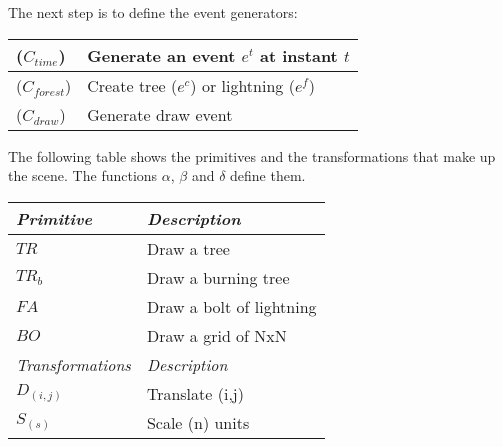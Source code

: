\documentclass[a4paper,twoside]{article}
\begin{document}

\noindent The next step is to define the event generators:


\begin{table}[h]
\begin{center}
\begin{small}
    \begin{tabular}{|l|l|}
        \hline ($C_{time}$)   & Generate an event $e^t$ at instant $t$\\
        \hline ($C_{forest}$)   & Create tree ($e^{c}$) or lightning ($e^{f}$)\\
        \hline ($C_{draw}$)   & Generate draw event\\
        \hline
\end{tabular}
\end{small}
\end{center}
\vspace{-0.3cm}
\end{table}




The following table shows the primitives and the transformations that make up the scene. The
functions ${\alpha}$, ${\beta}$ and ${\delta}$ define them.


\begin{table}[h]
\begin{center}
\begin{small}
    \begin{tabular}{|l|l|}
        \hline \itshape Primitive & \itshape Description\\
        \hline $TR$   & Draw a tree\\
        \hline $TR_b$ & Draw a burning tree\\
        \hline $FA$   & Draw a bolt of lightning\\
        \hline $BO$   & Draw a grid of NxN \\
        \hline
        \hline \itshape Transformations & \itshape Description\\
        \hline $D_{(i,j)}$ & Translate (i,j)\\
        \hline $S_{(s)}$ & Scale (n) units\\
        \hline
    \end{tabular}
\end{small}
\end{center}
\vspace{-0.3cm}
\end{table}
\end{document}
